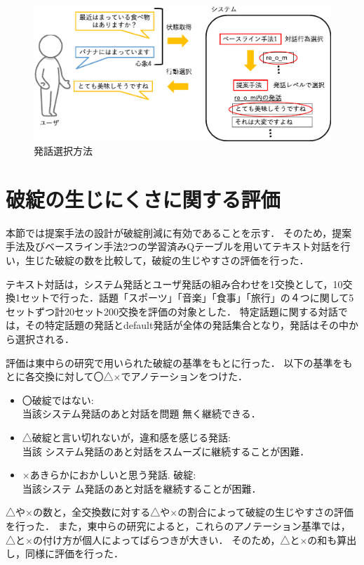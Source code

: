 \documentclass[12pt,a4paper,twoside,openany]{jbook}
\begin{document}
\begin{figure}[ht]
  \begin{center} %
    \includegraphics[width=\linewidth]{hatuwasentaku.eps}
    \caption{発話選択方法} %
    \label{hatuwasentakuzu} %
  \end{center}
\end{figure}


\section{破綻の生じにくさに関する評価}\label{hatanhindo}
本節では提案手法の設計が破綻削減に有効であることを示す．
そのため，提案手法及びベースライン手法2つの学習済みQテーブルを用いてテキスト対話を行い，生じた破綻の数を比較して，破綻の生じやすさの評価を行った．

テキスト対話は，システム発話とユーザ発話の組み合わせを1交換として，10交換1セットで行った．話題「スポーツ」「音楽」「食事」「旅行」の４つに関して5セットずつ計20セット200交換を評価の対象とした．
特定話題に関する対話では，その特定話題の発話とdefault発話が全体の発話集合となり，発話はその中から選択される．

評価は東中らの研究\cite{higashinaka}で用いられた破綻の基準をもとに行った．
以下の基準をもとに各交換に対して〇△×でアノテーションをつけた．
\begin{itemize}
\item 〇破綻ではない: \\当該システム発話のあと対話を問題
無く継続できる．
\item △破綻と言い切れないが，違和感を感じる発話:\\当該
システム発話のあと対話をスムーズに継続することが困難．
\item ×あきらかにおかしいと思う発話. 破綻: \\当該システ
ム発話のあと対話を継続することが困難．
\end{itemize}
△や×の数と，全交換数に対する△や×の割合によって破綻の生じやすさの評価を行った．
また，東中らの研究\cite{higashinaka}によると，これらのアノテーション基準では，△と×の付け方が個人によってばらつきが大きい．
そのため，△と×の和も算出し，同様に評価を行った．
\end{document}
